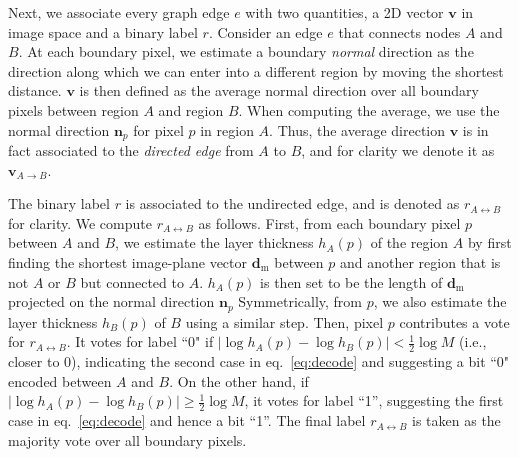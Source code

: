 \documentclass[12pt]{report}
\begin{document}
Next, we associate every graph edge $e$ with two quantities, a 2D vector
$\bm{v}$ in image space and a binary label $r$.
Consider an edge $e$ that connects nodes $A$ and $B$.
At each boundary pixel, we estimate a boundary \emph{normal} direction as the direction along
which we can enter into a different region by moving the shortest distance.
$\bm{v}$ is then defined as the average normal direction over all boundary pixels between
region $A$ and region $B$.
When computing the average, we use the normal direction $\bm{n}_p$ for pixel $p$ in region $A$.
Thus, the average direction $\bm{v}$ is in fact associated to the \emph{directed edge} from
$A$ to $B$, and for clarity we denote it as $\bm{v}_{A\to B}$. 


The binary label $r$ is associated to the undirected edge, and is denoted
as $r_{A\leftrightarrow B}$ for clarity. We compute $r_{A\leftrightarrow B}$ as follows.
First, from each boundary pixel $p$ between $A$ and $B$, we estimate the layer thickness
$h_A(p)$ of the region $A$ by first finding the shortest image-plane 
vector $\bm{d}_\textrm{m}$ between $p$ and another region 
that is not $A$ or $B$ but connected to $A$.
$h_A(p)$ is then set to be the length of $\bm{d}_\textrm{m}$ projected on the normal direction $\bm{n}_p$ 
Symmetrically, from $p$, we also estimate the layer thickness $h_B(p)$ of $B$ using a
similar step.
Then, pixel $p$ contributes a vote for $r_{A\leftrightarrow B}$.
It votes for label ``0" if $|\log h_A(p) - \log h_B(p)|< \frac{1}{2}\log M$
(i.e., closer to 0), indicating the second case in eq.~\ref{eq:decode}
and suggesting a bit ``0" encoded between $A$ and $B$.
On the other hand, if $|\log h_A(p) - \log h_B(p)|\ge \frac{1}{2}\log M$,
it votes for label ``1'', suggesting the first case in eq.~\ref{eq:decode} and hence a bit ``1''.
The final label $r_{A\leftrightarrow B}$ is taken as the majority vote over all boundary pixels.
\end{document}
